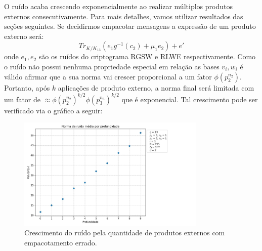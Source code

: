 O ruído acaba crescendo exponencialmente ao realizar múltiplos produtos externos consecutivamente. Para mais detalhes, 
vamos utilizar resultados das seções seguintes. Se decidirmos empacotar mensagens a expressão de um produto externo será:
$$
Tr_{K/K_{13}} (e_1g^{-1}(c_2) + \mu_1 e_2) + e'
$$
onde $e_1, e_2$ são os ruídos do criptograma RGSW e RLWE respectivamente. Como o ruído não possui nenhuma propriedade especial 
em relação as bases $v_i, w_i$ é válido afirmar que a sua norma vai crescer proporcional a um fator $\phi(p_2^{n_2})$. Portanto, após 
$k$ aplicações de produto externo, a norma final será limitada com um fator de $\approx \phi(p_2^{n_2})^{k/2} \phi(p_3^{n_3})^{k/2}$
que é exponencial. Tal crescimento pode ser verificado via o gráfico a seguir:

\begin{figure}[htbp]
    \centering
    \includegraphics[width=0.8\textwidth]{images/wrong_packing.jpg}
    \caption{Crescimento do ruído pela quantidade de produtos externos com empacotamento errado.}
    \label{fig:wrong_packing}
\end{figure}